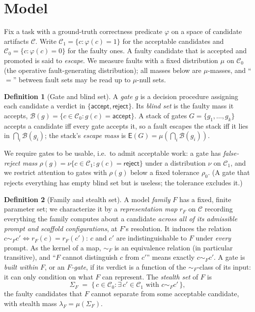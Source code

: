 \documentclass[11pt]{article}
\theoremstyle{definition}
\newtheorem{definition}{Definition}
\theoremstyle{remark}
\newcommand{\C}{\mathcal{C}}
\newcommand{\Cgood}{\C_{1}}
\newcommand{\Cbad}{\C_{0}}
\newcommand{\simF}{\sim_{F}}
\newcommand{\SigF}{\Sigma_{F}}
\newcommand{\lF}{\lambda_{F}}
\newcommand{\B}{\mathcal{B}}
\newcommand{\E}{\mathsf{E}}
\begin{document}
\section{Model}\label{sec:model}
Fix a task with a ground-truth correctness predicate $\varphi$ on a space of candidate artifacts
$\C$. Write $\Cgood=\{c:\varphi(c)=1\}$ for the acceptable candidates and $\Cbad=\{c:\varphi(c)=0\}$
for the faulty ones. A faulty candidate that is accepted and promoted is said to \emph{escape}.
We measure faults with a fixed distribution $\mu$ on $\Cbad$ (the operative fault-generating
distribution); all masses below are $\mu$-masses, and ``$=$'' between fault sets may be read up to
$\mu$-null sets.

\begin{definition}[Gate and blind set]
A \emph{gate} $g$ is a decision procedure assigning each candidate a verdict in
$\{\textsf{accept},\textsf{reject}\}$. Its \emph{blind set} is the faulty mass it accepts,
$\B(g)=\{c\in\Cbad: g(c)=\textsf{accept}\}$. A stack of gates $G=\{g_1,\dots,g_k\}$ accepts a
candidate iff every gate accepts it, so a fault escapes the stack iff it lies in
$\bigcap_i \B(g_i)$; the stack's \emph{escape mass} is $\E(G)=\mu\!\left(\bigcap_i \B(g_i)\right)$.
\end{definition}

We require gates to be usable, i.e.\ to admit acceptable work: a gate has \emph{false-reject mass}
$\rho(g)=\nu\{c\in\Cgood: g(c)=\textsf{reject}\}$ under a distribution $\nu$ on $\Cgood$, and we
restrict attention to gates with $\rho(g)$ below a fixed tolerance $\rho_0$. (A gate that rejects
everything has empty blind set but is useless; the tolerance excludes it.)

\begin{definition}[Family and stealth set]\label{def:family}
A model \emph{family} $F$ has a fixed, finite parameter set; we characterize it by a \emph{representation
map} $r_F$ on $\C$ recording everything the family computes about a candidate \emph{across all of its
admissible prompt and scaffold configurations}, at $F$'s resolution. It induces the relation
$c\simF c'\iff r_F(c)=r_F(c')$: $c$ and $c'$ are indistinguishable to $F$ under \emph{every} prompt. As
the kernel of a map, $\simF$ is an equivalence relation (in particular transitive), and ``$F$ cannot
distinguish $c$ from $c'$'' means exactly $c\simF c'$. A gate is \emph{built within $F$}, or an \emph{$F$-gate}, if its
verdict is a function of the $\simF$-class of its input: it can only condition on what $F$ can
represent. The \emph{stealth set} of $F$ is
\[
  \SigF \;=\; \bigl\{\, c\in\Cbad : \exists\, c'\in\Cgood \text{ with } c\simF c' \,\bigr\},
\]
the faulty candidates that $F$ cannot separate from some acceptable candidate, with stealth mass
$\lF=\mu(\SigF)$.
\end{definition}
\end{document}
